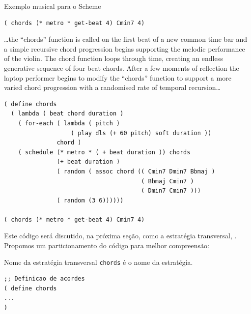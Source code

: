 \begin{example}{Exemplo musical para o Scheme}
\begin{verbatim}
( chords (* metro * get-beat 4) Cmin7 4)
\end{verbatim}

\begin{citacao}
{\ldots the “chords” function is called on the first beat of a new common time bar and a simple recursive chord progression begins supporting the melodic performance of the violin. The chord function loops through time, creating an endless generative sequence of four beat chords. After a few moments of reflection the laptop performer begins to modify the “chords” function to support a more varied chord progression with a randomised rate of temporal recursion\ldots}
\end{citacao}

\begin{verbatim}
( define chords
  ( lambda ( beat chord duration )
    ( for-each ( lambda ( pitch )
                   ( play dls (+ 60 pitch) soft duration ))
               chord )
    ( schedule (* metro * ( + beat duration )) chords
               (+ beat duration )
               ( random ( assoc chord (( Cmin7 Dmin7 Bbmaj )
                                       ( Bbmaj Cmin7 )
                                       ( Dmin7 Cmin7 )))
               ( random (3 6))))))

( chords (* metro * get-beat 4) Cmin7 4)
\end{verbatim}
\end{example}

Este código será discutido, na próxima seção, como a estratégia transversal, . Propomos um particionamento do código para melhor compreensão:

\begin{example}{Nome da estratégia transversal}
\verb|chords| é o nome da estratégia.

\begin{verbatim}
;; Definicao de acordes
( define chords
...
)
\end{verbatim}
\end{example}

